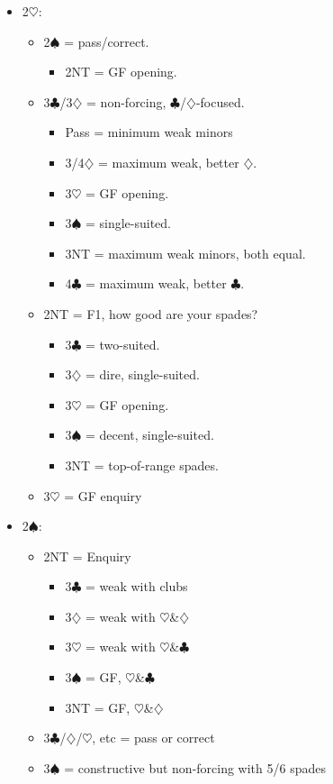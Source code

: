 \documentclass[a4paper,14pt]{extarticle}
\begin{document}
\begin{itemize}
\item 2$\heartsuit$:
	\begin{itemize}
   \item 2$\spadesuit$ = pass/correct.
		\begin{itemize}
      \item 2NT = GF opening.
		\end{itemize}
   \item 3$\clubsuit$/3$\diamondsuit$ = non-forcing, $\clubsuit$/$\diamondsuit$-focused.
		\begin{itemize}
		\item Pass = minimum weak minors
      \item 3/4$\diamondsuit$ = maximum weak, better $\diamondsuit$.
      \item 3$\heartsuit$ = GF opening.
      \item 3$\spadesuit$ = single-suited.
      \item 3NT = maximum weak minors, both equal.
      \item 4$\clubsuit$ = maximum weak, better $\clubsuit$.
		\end{itemize}
   \item 2NT = F1, how good are your spades?
		\begin{itemize}
      \item 3$\clubsuit$ = two-suited.
      \item 3$\diamondsuit$ = dire, single-suited.
      \item 3$\heartsuit$ = GF opening.
      \item 3$\spadesuit$ = decent, single-suited.
      \item 3NT = top-of-range spades.
		\end{itemize}
	\item 3$\heartsuit$ = GF enquiry
	\end{itemize}

\newpage

\item 2$\spadesuit$:
	\begin{itemize}
   \item 2NT = Enquiry
		\begin{itemize}
      \item 3$\clubsuit$ = weak with clubs
      \item 3$\diamondsuit$ = weak with $\heartsuit$\&$\diamondsuit$
      \item 3$\heartsuit$ = weak with $\heartsuit$\&$\clubsuit$
      \item 3$\spadesuit$ = GF, $\heartsuit$\&$\clubsuit$
      \item 3NT = GF, $\heartsuit$\&$\diamondsuit$
		\end{itemize}
   \item 3$\clubsuit$/$\diamondsuit$/$\heartsuit$, etc = pass or correct
   \item 3$\spadesuit$ = constructive but non-forcing with 5/6 spades
	\end{itemize}


\end{itemize}
\end{document}

